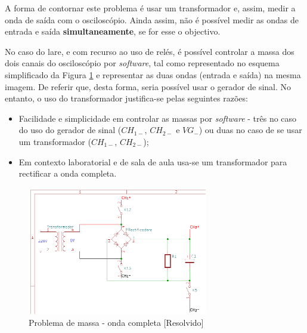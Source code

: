 A forma de contornar este problema é usar um transformador e, assim, medir a onda de saída com o osciloscópio. Ainda assim, não é possível medir as ondas de entrada e saída \textbf{simultaneamente}, se for esse o objectivo.

No caso do \acrshort{lare}, e com recurso ao uso de relés, é possível controlar a massa dos dois canais do osciloscópio por \textit{software}, tal como representado no esquema simplificado da Figura \ref{fig:ondacompleta-massa} e representar as duas ondas (entrada e saída) na mesma imagem. De referir que, desta forma, seria possível usar o gerador de sinal. No entanto, o uso do transformador justifica-se pelas seguintes razões:
\begin{itemize}
	\item Facilidade e simplicidade em controlar as massas por \textit{software} - três no caso do uso do gerador de sinal ($CH_{1-}$, $CH_{2-}$ e $VG_{-}$) ou duas no caso de se usar um transformador ($CH_{1-}$, $CH_{2-}$);
	\item Em contexto laboratorial e de sala de aula usa-se um transformador para rectificar a onda completa.
\end{itemize}


\begin{figure}[hbtp]
	\centering
	\includegraphics[width=0.7\textwidth]{figures/sch-ondacompleta-massa.png}
	\caption{Problema de massa - onda completa [Resolvido]}
	\label{fig:ondacompleta-massa}
\end{figure}

